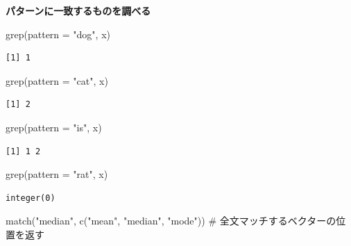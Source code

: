 \documentclass[
  letterpaper,
  DIV=11,
  numbers=noendperiod]{scrreprt}
\newenvironment{Shaded}{\begin{snugshade}}{\end{snugshade}}
\newcommand{\AttributeTok}[1]{\textcolor[rgb]{0.40,0.45,0.13}{#1}}
\newcommand{\CommentTok}[1]{\textcolor[rgb]{0.37,0.37,0.37}{#1}}
\newcommand{\FunctionTok}[1]{\textcolor[rgb]{0.28,0.35,0.67}{#1}}
\newcommand{\NormalTok}[1]{\textcolor[rgb]{0.00,0.23,0.31}{#1}}
\newcommand{\StringTok}[1]{\textcolor[rgb]{0.13,0.47,0.30}{#1}}
\begin{document}
\textbf{パターンに一致するものを調べる}

\begin{Shaded}
\begin{Highlighting}[]
\FunctionTok{grep}\NormalTok{(}\AttributeTok{pattern =} \StringTok{"dog"}\NormalTok{, x)}
\end{Highlighting}
\end{Shaded}

\begin{verbatim}
[1] 1
\end{verbatim}

\begin{Shaded}
\begin{Highlighting}[]
\FunctionTok{grep}\NormalTok{(}\AttributeTok{pattern =} \StringTok{"cat"}\NormalTok{, x)}
\end{Highlighting}
\end{Shaded}

\begin{verbatim}
[1] 2
\end{verbatim}

\begin{Shaded}
\begin{Highlighting}[]
\FunctionTok{grep}\NormalTok{(}\AttributeTok{pattern =} \StringTok{"is"}\NormalTok{, x)}
\end{Highlighting}
\end{Shaded}

\begin{verbatim}
[1] 1 2
\end{verbatim}

\begin{Shaded}
\begin{Highlighting}[]
\FunctionTok{grep}\NormalTok{(}\AttributeTok{pattern =} \StringTok{"rat"}\NormalTok{, x)}
\end{Highlighting}
\end{Shaded}

\begin{verbatim}
integer(0)
\end{verbatim}

\begin{Shaded}
\begin{Highlighting}[]
\FunctionTok{match}\NormalTok{(}\StringTok{"median"}\NormalTok{,   }\FunctionTok{c}\NormalTok{(}\StringTok{"mean"}\NormalTok{, }\StringTok{"median"}\NormalTok{, }\StringTok{"mode"}\NormalTok{)) }\CommentTok{\# 全文マッチするベクターの位置を返す}
\end{Highlighting}
\end{Shaded}
\end{document}

